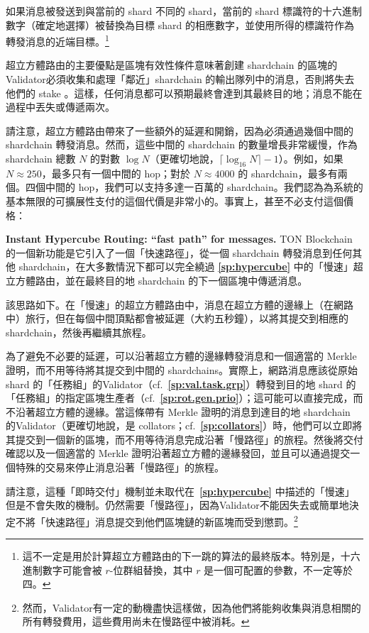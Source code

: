 \documentclass[12pt,oneside]{article}
\def\makepoint#1{\medbreak\noindent{\bf #1.\ }}
\def\nxsubpoint{\refstepcounter{subsubsection}%
  \smallbreak\makepoint{\thesubsubsection}}
\def\refpoint#1{{\rm\textbf{\ref{#1}}}}
\let\ptref=\refpoint
\def\embt(#1.){\textbf{#1.}}
\begin{document}
如果消息被發送到與當前的 shard 不同的 shard，當前的 shard 標識符的十六進制數字（確定地選擇）被替換為目標 shard 的相應數字，並使用所得的標識符作為轉發消息的近端目標。\footnote{這不一定是用於計算超立方體路由的下一跳的算法的最終版本。特別是，十六進制數字可能會被 $r$-位群組替換，其中 $r$ 是一個可配置的參數，不一定等於四。}

超立方體路由的主要優點是區塊有效性條件意味著創建 shardchain 的區塊的Validator必須收集和處理「鄰近」shardchain 的輸出隊列中的消息，否則將失去他們的 stake 。這樣，任何消息都可以預期最終會達到其最終目的地；消息不能在過程中丟失或傳遞兩次。

請注意，超立方體路由帶來了一些額外的延遲和開銷，因為必須通過幾個中間的 shardchain 轉發消息。然而，這些中間的 shardchain 的數量增長非常緩慢，作為 shardchain 總數 $N$ 的對數 $\log N$（更確切地說，$\lceil\log_{16}N\rceil-1$）。例如，如果 $N\approx250$，最多只有一個中間的 hop；對於 $N\approx4000$ 的 shardchain，最多有兩個。四個中間的 hop，我們可以支持多達一百萬的 shardchain。我們認為為系統的基本無限的可擴展性支付的這個代價是非常小的。事實上，甚至不必支付這個價格：

\nxsubpoint\label{sp:instant.hypercube} \embt(Instant Hypercube
Routing: ``fast path'' for messages.) TON Blockchain 的一個新功能是它引入了一個「快速路徑」，從一個 shardchain 轉發消息到任何其他 shardchain，在大多數情況下都可以完全繞過 \ptref{sp:hypercube} 中的「慢速」超立方體路由，並在最終目的地 shardchain 的下一個區塊中傳遞消息。

該思路如下。在「慢速」的超立方體路由中，消息在超立方體的邊緣上（在網路中）旅行，但在每個中間頂點都會被延遲（大約五秒鐘），以將其提交到相應的 shardchain，然後再繼續其旅程。

為了避免不必要的延遲，可以沿著超立方體的邊緣轉發消息和一個適當的 Merkle 證明，而不用等待將其提交到中間的 shardchains。實際上，網路消息應該從原始 shard 的「任務組」的Validator（cf.~\ptref{sp:val.task.grp}）轉發到目的地 shard 的「任務組」的指定區塊生產者（cf.~\ptref{sp:rot.gen.prio}）；這可能可以直接完成，而不沿著超立方體的邊緣。當這條帶有 Merkle 證明的消息到達目的地 shardchain 的Validator（更確切地說，是 collators；cf.~\ptref{sp:collators}）時，他們可以立即將其提交到一個新的區塊，而不用等待消息完成沿著「慢路徑」的旅程。然後將交付確認以及一個適當的 Merkle 證明沿著超立方體的邊緣發回，並且可以通過提交一個特殊的交易來停止消息沿著「慢路徑」的旅程。

請注意，這種「即時交付」機制並未取代在~\ptref{sp:hypercube} 中描述的「慢速」但是不會失敗的機制。仍然需要「慢路徑」，因為Validator不能因失去或簡單地決定不將「快速路徑」消息提交到他們區塊鏈的新區塊而受到懲罰。\footnote{然而，Validator有一定的動機盡快這樣做，因為他們將能夠收集與消息相關的所有轉發費用，這些費用尚未在慢路徑中被消耗。}
\end{document}

